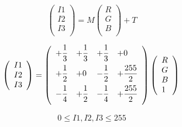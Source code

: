 \documentclass{article}
\begin{document}
\[ \left( \begin{array}{l} I1 \\ I2 \\ I3 \\ \end{array} \right) = M \left( \begin{array}{l} R \\ G \\ B \\ \end{array} \right) + T \]
\pagebreak

\[ \left( \begin{array}{l} I1 \\ I2 \\ I3 \\ \end{array} \right) = \left( \begin{array}{llll} +\dfrac{1}{3} & +\dfrac{1}{3} & +\dfrac{1}{3} & +0 \vspace{.5em} \\ +\dfrac{1}{2} & +0 & -\dfrac{1}{2} & +\dfrac{255}{2} \vspace{.5em} \\ -\dfrac{1}{4} & +\dfrac{1}{2} & -\dfrac{1}{4} & +\dfrac{255}{2} \vspace{.5em} \\ \end{array} \right) \left( \begin{array}{l} R \\ G \\ B \\ 1 \\ \end{array} \right)\\ \]
\pagebreak

\[ 0 \le I1, I2, I3 \le 255 \]
\pagebreak
\end{document}
